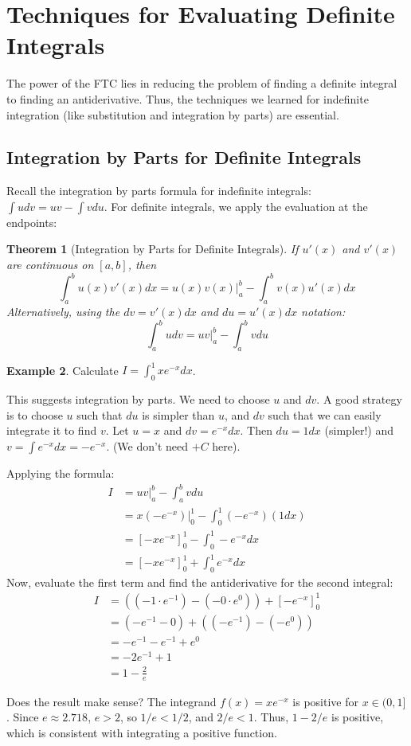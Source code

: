 \documentclass[11pt]{article}
\newtheorem{theorem}{Theorem}[section]
\theoremstyle{definition}
\newtheorem{example}[theorem]{Example}
\theoremstyle{remark} %
\begin{document}
\section{Techniques for Evaluating Definite Integrals}

The power of the FTC lies in reducing the problem of finding a definite integral to finding an antiderivative. Thus, the techniques we learned for indefinite integration (like substitution and integration by parts) are essential.

\subsection{Integration by Parts for Definite Integrals}

Recall the integration by parts formula for indefinite integrals: $\int u dv = uv - \int v du$. For definite integrals, we apply the evaluation at the endpoints:

\begin{theorem}[Integration by Parts for Definite Integrals]
If $u'(x)$ and $v'(x)$ are continuous on $[a, b]$, then
\[
\int_a^b u(x) v'(x) dx = u(x) v(x) \bigg|_a^b - \int_a^b v(x) u'(x) dx
\]
Alternatively, using the $dv = v'(x)dx$ and $du = u'(x)dx$ notation:
\[
\int_a^b u dv = uv \bigg|_a^b - \int_a^b v du
\]
\end{theorem}

\begin{example}
Calculate $I = \int_0^1 x e^{-x} dx$.

This suggests integration by parts. We need to choose $u$ and $dv$. A good strategy is to choose $u$ such that $du$ is simpler than $u$, and $dv$ such that we can easily integrate it to find $v$.
Let $u = x$ and $dv = e^{-x} dx$.
Then $du = 1 dx$ (simpler!) and $v = \int e^{-x} dx = -e^{-x}$. (We don't need $+C$ here).

Applying the formula:
\begin{align*} I &= uv \bigg|_a^b - \int_a^b v du \\ &= x(-e^{-x}) \bigg|_0^1 - \int_0^1 (-e^{-x}) (1 dx) \\ &= [-xe^{-x}]_0^1 - \int_0^1 -e^{-x} dx \\ &= [-xe^{-x}]_0^1 + \int_0^1 e^{-x} dx \end{align*}
Now, evaluate the first term and find the antiderivative for the second integral:
\begin{align*} I &= \left( (-1 \cdot e^{-1}) - (-0 \cdot e^{0}) \right) + \left[ -e^{-x} \right]_0^1 \\ &= (-e^{-1} - 0) + \left( (-e^{-1}) - (-e^{0}) \right) \\ &= -e^{-1} - e^{-1} + e^{0} \\ &= -2e^{-1} + 1 \\ &= 1 - \frac{2}{e} \end{align*}

Does the result make sense? The integrand $f(x) = xe^{-x}$ is positive for $x \in (0, 1]$. Since $e \approx 2.718$, $e > 2$, so $1/e < 1/2$, and $2/e < 1$. Thus, $1 - 2/e$ is positive, which is consistent with integrating a positive function.
\end{example}
\end{document}
